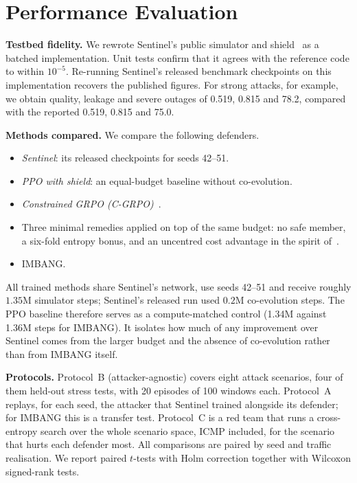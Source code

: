 \documentclass[conference]{IEEEtran}
\begin{document}
\section{Performance Evaluation}
\label{sec:eval}
\textbf{Testbed fidelity.} We rewrote Sentinel's public simulator and shield~\cite{sentinelcode} as a batched implementation. Unit tests confirm that it agrees with the reference code to within $10^{-5}$. Re-running Sentinel's released benchmark checkpoints on this implementation recovers the published figures. For strong attacks, for example, we obtain quality, leakage and severe outages of 0.519, 0.815 and 78.2, compared with the reported 0.519, 0.815 and 75.0.

\textbf{Methods compared.} We compare the following defenders.
\begin{itemize}
\item \emph{Sentinel}: its released checkpoints for seeds 42--51.
\item \emph{PPO with shield}: an equal-budget baseline without co-evolution.
\item \emph{Constrained GRPO (C-GRPO)}~\cite{girgis2026cgrpo}.
\item Three minimal remedies applied on top of the same budget: no safe member, a six-fold entropy bonus, and an uncentred cost advantage in the spirit of~\cite{nie2026starvation}.
\item IMBANG.
\end{itemize}
All trained methods share Sentinel's network, use seeds 42--51 and receive roughly $1.35$M simulator steps; Sentinel's released run used $0.2$M co-evolution steps. The PPO baseline therefore serves as a compute-matched control (1.34M against 1.36M steps for IMBANG). It isolates how much of any improvement over Sentinel comes from the larger budget and the absence of co-evolution rather than from IMBANG itself.

\textbf{Protocols.} Protocol~B (attacker-agnostic) covers eight attack scenarios, four of them held-out stress tests, with 20 episodes of 100 windows each. Protocol~A replays, for each seed, the attacker that Sentinel trained alongside its defender; for IMBANG this is a transfer test. Protocol~C is a red team that runs a cross-entropy search over the whole scenario space, ICMP included, for the scenario that hurts each defender most. All comparisons are paired by seed and traffic realisation. We report paired $t$-tests with Holm correction together with Wilcoxon signed-rank tests.
\end{document}
